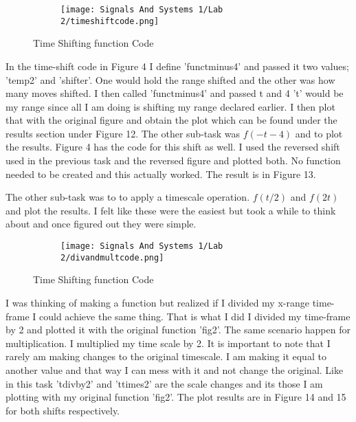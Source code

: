 \documentclass[12pt,a4paper]{article}
\begin{document}
\begin{figure}[h]
\begin{subfigure}{ 1\textwidth}
\texttt{[image: Signals And Systems 1/Lab 2/timeshiftcode.png]}
\end{subfigure}
\caption{Time Shifting function Code}
\label{fig:image2}
\end{figure}

\clearpage
In the time-shift code in Figure 4 I define 'functminus4' and passed it two values; 'temp2' and 'shifter'. One would hold the range shifted and the other was how many moves shifted. I then called 'functminus4' and passed t and 4 't' would be my range since all I am doing is shifting my range declared earlier. I then plot that with the original figure and obtain the plot which can be found under the results section under Figure 12.
The other sub-task was $f(-t-4)$ and to plot the results. Figure 4 has the code for this shift as well. I used the reversed shift used in the previous task and the reversed figure and plotted both. No function needed to be created and this actually worked. The result is in Figure 13.



\newline
The other sub-task was to to apply a timescale operation. $f(t/2)$ and $f(2t)$ and plot the results. I felt like these were the easiest but took a while to think about and once figured out they were simple.




\begin{figure}[h]
\begin{subfigure}{ 1\textwidth}
\texttt{[image: Signals And Systems 1/Lab 2/divandmultcode.png]}
\end{subfigure}
\caption{Time Shifting function Code}
\label{fig:image2}
\end{figure}
\noindent I was thinking of making a function but realized if I divided my x-range time-frame I could achieve the same thing. That is what I did I divided my time-frame by 2 and plotted it with the original function 'fig2'. The same scenario happen for multiplication. I multiplied my time scale by 2. It is important to note that I rarely am making changes to the original timescale. I am making it equal to another value and that way I can mess with it and not change the original. Like in this task 'tdivby2' and 'ttimes2' are the scale changes and its those I am plotting with my original function 'fig2'. The plot results are in Figure 14 and 15 for both shifts respectively.
\end{document}
